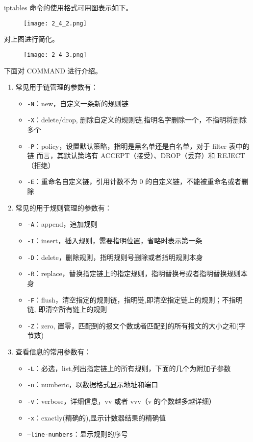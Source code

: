 iptables 命令的使用格式可用图表示如下。
\begin{figure}[H]
  \begin{center}
    \texttt{[image: 2\_4\_2.png]}
  \end{center}
\end{figure}

对上图进行简化。
\begin{figure}[H]
  \begin{center}
    \texttt{[image: 2\_4\_3.png]}
  \end{center}
\end{figure}

下面对 COMMAND 进行介绍。
\begin{enumerate}
  \item 常见用于链管理的参数有：
    \begin{itemize}
      \item \texttt{-N}：new，自定义一条新的规则链
      \item \texttt{-X}：delete/drop, 删除自定义的规则链,指明名字删除一个，不指明将删除多个
      \item \texttt{-P}：policy，设置默认策略，指明是黑名单还是白名单，对于 filter 表中的链
        而言，其默认策略有 ACCEPT（接受）、DROP（丢弃）和 REJECT（拒绝）
      \item \texttt{-E}：重命名自定义链，引用计数不为 0 的自定义链，不能被重命名或者删除
    \end{itemize}
  \item 常见的用于规则管理的参数有：
    \begin{itemize}
      \item \texttt{-A}：append，追加规则
      \item \texttt{-I}：insert，插入规则，需要指明位置，省略时表示第一条
      \item \texttt{-D}：delete，删除规则，指明规则号删除或者指明规则本身
      \item \texttt{-R}：replace，替换指定链上的指定规则，指明替换号或者指明替换规则本身
      \item \texttt{-F}：flush，清空指定的规则链，指明链,即清空指定链上的规则；不指明链,
        即清空所有链上的规则
      \item \texttt{-Z}：zero, 置零，匹配到的报文个数或者匹配到的所有报文的大小之和(字节数)
    \end{itemize}
  \item 查看信息的常用参数有：
    \begin{itemize}
      \item \texttt{-L}：必选，list,列出指定链上的所有规则，下面的几个为附加子参数
      \item \texttt{-n}：numberic，以数据格式显示地址和端口
      \item \texttt{-v}：verbose，详细信息，vv 或者 vvv（v 的个数越多越详细）
      \item \texttt{-x}：exactly(精确的),显示计数器结果的精确值
      \item \texttt{--line-numbers}：显示规则的序号
    \end{itemize}
\end{enumerate}

